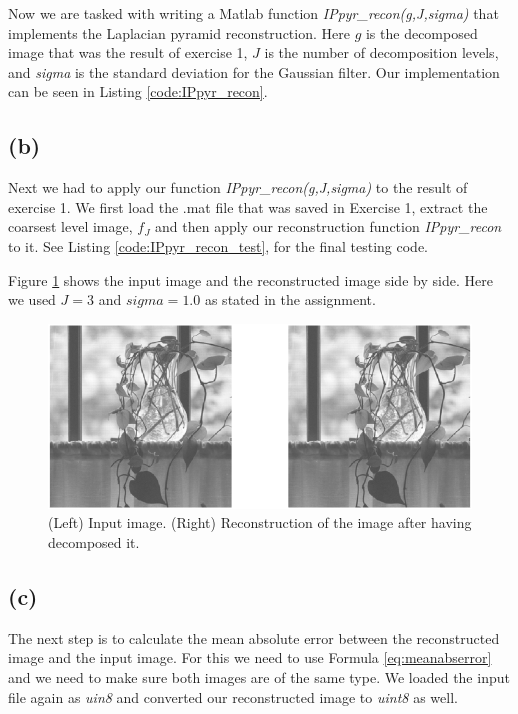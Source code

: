 \documentclass{article}
\begin{document}
Now we are tasked with writing a Matlab function \textit{IPpyr\_recon(g,J,sigma)} that implements the Laplacian pyramid reconstruction. Here $g$ is the decomposed image that was the result of exercise 1, $J$ is the number of decomposition levels, and \textit{sigma} is the standard deviation for the Gaussian filter. Our implementation can be seen in  Listing \ref{code:IPpyr_recon}.

\subsection*{(b)}
Next we had to apply our function \textit{IPpyr\_recon(g,J,sigma)} to the result of exercise 1. We first load the .mat file that was saved in Exercise 1, extract the coarsest level image, $f_J$ and then apply our reconstruction function \textit{IPpyr\_recon} to it. See  Listing \ref{code:IPpyr_recon_test}, for the final testing code.

Figure \ref{fig:2b} shows the input image and the reconstructed image side by side. Here we used $J = 3$ and $sigma = 1.0$ as stated in the assignment.

\begin{figure}[h]
    \centering
    \includegraphics[width=\textwidth]{Assignment_3/output_plots/IPpyr_recon_test_partial.png}
    \caption{(Left) Input image. (Right) Reconstruction of the image after having decomposed it.}
    \label{fig:2b}
\end{figure}

\subsection*{(c)}
The next step is to calculate the mean absolute error between the reconstructed image and the input image. For this we need to use Formula \ref{eq:meanabserror} and we need to make sure both images are of the same type. We loaded the input file again as \textit{uin8} and converted our reconstructed image to \textit{uint8} as well.
\end{document}
